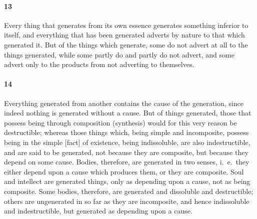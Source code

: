 \documentclass[12pt]{article}
\begin{document}
\paragraph{13} Every thing that generates from its own es\-sence generates
something inferior to itself, and everything that has been generated adverts by
nature to that which generated it. But of the things which generate, some do
not advert at all to the things generated, while some partly do and partly do
not advert, and some advert only to the products from not adverting to
themselves.

\paragraph{14} Everything generated from another contains the cause of the
generation, since indeed nothing is generated without a cause. But of things
generated, those that possess being through composition (synthesis) would for
this very reason be destructible; whereas those things which, being simple and
incomposite, possess being in the simple [fact] of existence, being
indissoluble, are also indestructible, and are said to be generated, not
because they are composite, but because they depend on some cause. Bodies,
therefore, are generated in two senses, i.~e.~they either depend upon a cause
which produces them, or they are composite. Soul and intellect are generated
things, only as depending upon a cause, not as being composite. Some bodies,
therefore, are generated and dissoluble and destructible; others are
ungenerated in so far as they are incomposite, and hence indissoluble and
indestructible, but generated as depending upon a cause.
\end{document}
